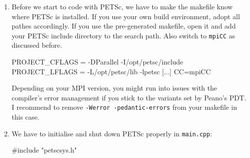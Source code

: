 \begin{enumerate}
  \item Before we start to code with PETSc, we have to make the makefile know
  where PETSc is installed. If you use your own build environment, adopt all
  pathes accordingly. If you use the pre-generated makefile, open it and add
  your PETSc include directory to the search path. Also switch to
  \texttt{mpiCC} as discussed before.
  \begin{code}
    PROJECT_CFLAGS = -DParallel -I/opt/petsc/include 
    PROJECT_LFLAGS = -L/opt/petsc/lib -lpetsc 
    [...]
    CC=mpiCC
  \end{code}
  Depending on your MPI version, you 
  might run into issues with the compiler's error management if you stick to
  the variants set by Peano's PDT.
  I recommend to
  remove \texttt{-Werror -pedantic-errors} from your makefile in this case.
% 
% 
%   
% 
% 
  \item We have to initialise and shut down PETSc properly in
  \texttt{main.cpp}:
  \begin{code}
#include "petscsys.h"


\end{code}
\end{enumerate}

